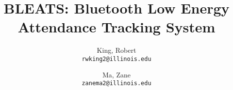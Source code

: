 \documentclass{mobicom}
\begin{document}
\title{BLEATS: Bluetooth Low Energy Attendance Tracking System}
\author{
  King, Robert\\
  \texttt{rwking2@illinois.edu}
  \and
  Ma, Zane\\
  \texttt{zanema2@illinois.edu}
}

\maketitle
\thispagestyle{empty}

\newcommand{\update}[1]{{\color{black}#1}\xspace}

\newcommand{\twolinecell}[2][r]{%
  \begin{tabular}[#1]{@{}c@{}}#2\end{tabular}}

\def\blackI{\ding{202}}
\def\blackII{\ding{203}}
\def\blackIII{\ding{204}}
\def\blackIV{\ding{205}}
\def\blackV{\ding{206}}
\def\blackVI{\ding{207}}
\def\blackVII{\ding{208}}
\end{document}
